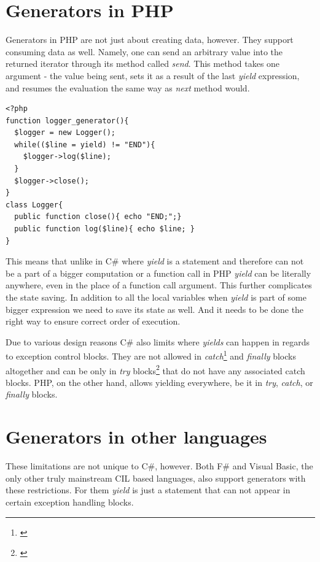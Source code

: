 \section{Generators in PHP}

Generators in PHP are not just about creating data, however. They support consuming data as well. Namely, one can send an arbitrary value into the returned iterator through its method called \emph{send}. This method takes one argument - the value being sent, sets it as a result of the last \emph{yield} expression, and resumes the evaluation the same way as \emph{next} method would.

\begin{verbatim}
<?php
function logger_generator(){
  $logger = new Logger();
  while(($line = yield) != "END"){
    $logger->log($line);
  }
  $logger->close();
}
class Logger{
  public function close(){ echo "END;";}
  public function log($line){ echo $line; }
}
\end{verbatim}

This means that unlike in C\# where \emph{yield} is a statement and therefore can not be a part of a bigger computation or a function call in PHP \emph{yield} can be literally anywhere, even in the place of a function call argument. This further complicates the state saving. In addition to all the local variables when \emph{yield} is part of some bigger expression we need to save its state as well. And it needs to be done the right way to ensure correct order of execution.

Due to various design reasons \citep{CSharpYieldFinaly} C\# also limits where \emph{yields} can happen in regards to exception control blocks. They are not allowed in \emph{catch}\footnote{\citep{CSharpYieldCatch}} and \emph{finally} blocks altogether and can be only in \emph{try} blocks\footnote{\citep{CSharpYieldTry}} that do not have any associated catch blocks. PHP, on the other hand, allows yielding everywhere, be it in \emph{try}, \emph{catch}, or \emph{finally} blocks.

\section{Generators in other languages}

These limitations are not unique to C\#, however. Both F\# and Visual Basic, the only other truly mainstream CIL based languages, also support generators with these restrictions. For them \emph{yield} is just a statement that can not appear in certain exception handling blocks.

